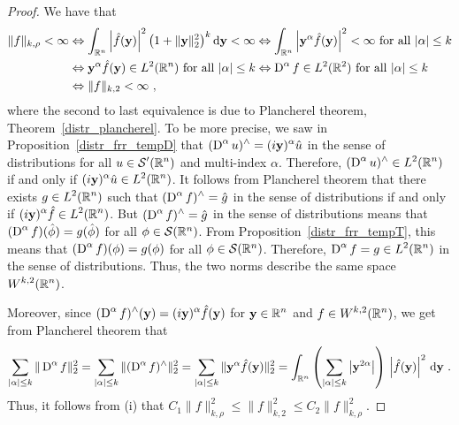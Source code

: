\begin{proof}
  We have that
\begin{align*}
\|f\|_{k,\rho} < \infty
&\Leftrightarrow \int_{\mathbb{R}^n} \left| \hat{f}(\mathbf{y})\right|^2
\big( 1 + \|\mathbf{y}\|_2^2\big)^k \,\mathrm{d}{\mathbf{y}} < \infty
\Leftrightarrow \int_{\mathbb{R}^n} \left| \mathbf{y}^\alpha \hat{f}(\mathbf{y}) \right|^2
< \infty \ \text{for all} \ |\alpha| \leq k \\
&\Leftrightarrow \mathbf{y}^\alpha \hat{f}(\mathbf{y}) \in L^2(\mathbb{R}^n)
 \ \text{for all} \ |\alpha| \leq k  
\Leftrightarrow \operatorname{D}^\alpha f \in L^2(\mathbb{R}^2) 
  \ \text{for all} \ |\alpha| \leq k \\
&\Leftrightarrow \|f\|_{k,2} < \infty \ ,
\end{align*}
where the second to last equivalence is due to 
Plancherel theorem, Theorem~\ref{distr_plancherel}.  To be
more precise, we saw in Proposition~\ref{distr_frr_tempD} that 
$\displaystyle (\operatorname{D}^\alpha u)^\wedge = (i \mathbf{y})^\alpha \hat{u}$ in the
sense of distributions for all $\displaystyle u \in \mathcal{S}'(\mathbb{R}^n)$ and
multi-index $\alpha$.
Therefore, $\displaystyle (\operatorname{D}^\alpha u)^\wedge \in L^2(\mathbb{R}^n)$ if and only if
$\displaystyle (i \mathbf{y})^\alpha \hat{u} \in L^2(\mathbb{R}^n)$.  It follows
from Plancherel theorem that there exists $\displaystyle g \in L^2(\mathbb{R}^n)$
such that $\displaystyle (\operatorname{D}^\alpha f)^\wedge = \hat{g}$ in the sense of
distributions if and only if
$\displaystyle (i \mathbf{y})^\alpha \hat{f} \in L^2(\mathbb{R}^n)$.
But $\displaystyle (\operatorname{D}^\alpha f)^\wedge = \hat{g}$ in the sense of
distributions means that
$\displaystyle (\operatorname{D}^\alpha f)(\hat{\phi}) = g(\hat{\phi})$
for all $\phi \in \mathcal{S}(\mathbb{R}^n)$.  From
Proposition~\ref{distr_frr_tempT}, this means that
$\displaystyle (\operatorname{D}^\alpha f)(\phi) = g(\phi)$
for all $\phi \in \mathcal{S}(\mathbb{R}^n)$.  Therefore,
$\displaystyle \operatorname{D}^\alpha f = g \in L^2(\mathbb{R}^n)$ in the sense of
distributions.
Thus, the two norms describe the same space $\displaystyle W^{k,2}(\mathbb{R}^n)$.

Moreover, since
$\displaystyle (\operatorname{D}^\alpha f)^\wedge(\mathbf{y})
=(i\mathbf{y})^\alpha \hat{f}(\mathbf{y})$
for $\displaystyle \mathbf{y}\in \mathbb{R}^n$ and
$\displaystyle f \in W^{k,2}(\mathbb{R}^n)$, we get from Plancherel theorem that
\[
\sum_{|\alpha|\leq k} \| \operatorname{D}^\alpha f \|_2^2 =
\sum_{|\alpha|\leq k} \| (\operatorname{D}^\alpha f)^\wedge \|_2^2 =
\sum_{|\alpha|\leq k} \| \mathbf{y}^\alpha \hat{f}(\mathbf{y}) \|_2^2 =
\int_{\mathbb{R}^n} \left( \sum_{|\alpha|\leq k}
\left|\mathbf{y}^{2\alpha}\right| \right)
\, \left| \hat{f}(\mathbf{y}) \right|^2 \,\mathrm{d}{\mathbf{y}} \ .
\]
Thus, it follows from (i) that $\displaystyle C_1 \|f\|_{k,\rho}^2
\leq \|f\|_{k,2}^2 \leq C_2 \|f\|_{k,\rho}^2$.
\end{proof}

